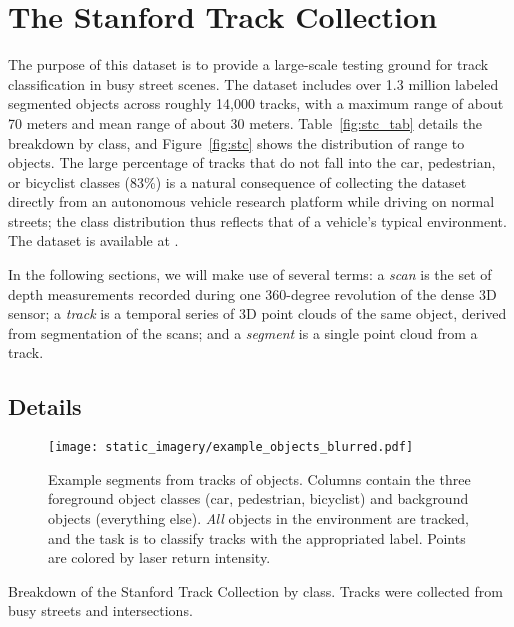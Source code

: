 \documentclass[letterpaper, 10 pt, conference]{ieeeconf}  %
\begin{document}
\section{The Stanford Track Collection}
\label{sec:stc}

The purpose of this dataset is to provide a large-scale testing ground for track classification in busy street scenes.  The dataset includes over 1.3 million labeled segmented objects across roughly 14,000 tracks, with a maximum range of about 70 meters and mean range of about 30 meters.  Table~\ref{fig:stc_tab} details the breakdown by class, and Figure~\ref{fig:stc} shows the distribution of range to objects.  The large percentage of tracks that do not fall into the car, pedestrian, or bicyclist classes (83\%) is a natural consequence of collecting the dataset directly from an autonomous vehicle research platform while driving on normal streets; the class distribution thus reflects that of a vehicle's typical environment.  The dataset is available at \cite{StanfordTrackCollection}.

In the following sections, we will make use of several terms: a \textit{scan} is the set of depth measurements recorded during one 360-degree revolution of the dense 3D sensor; a \textit{track} is a temporal series of 3D point clouds of the same object, derived from segmentation of the scans; and a \textit{segment} is a single point cloud from a track.

\subsection{Details}

\begin{figure}
  \centering
  \texttt{[image: static\_imagery/example\_objects\_blurred.pdf]}
  \caption{Example segments from tracks of objects.  Columns contain the three foreground object classes (car, pedestrian, bicyclist) and background objects (everything else). \textit{All} objects in the environment are tracked, and the task is to classify tracks with the appropriated label.  Points are colored by laser return intensity.}
  \label{fig:test_examples}
\end{figure}

\begin{table}
  \centering
  
  \caption{Breakdown of the Stanford Track Collection by class.  Tracks were collected from busy streets and intersections.}
  \label{fig:stc_tab}
\end{table}
\end{document}
